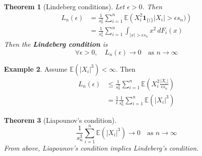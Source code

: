 \documentclass[10pt, oneside, reqno]{amsart}
\theoremstyle{plain}%
\newtheorem{thm}{Theorem}[section]
\theoremstyle{definition}
\newtheorem{exmp}[thm]{Example}
\theoremstyle{remark}
\newcommand{\E}{\mathbb{E}}
\newcommand{\indic}[1]{\mathbf{1}_{\{ #1 \}} }
\newcommand{\sumni}{\sum_{i=1}^n}
\begin{document}
\begin{thm}[Lindeberg conditions]
    Let $\epsilon > 0$.  Then \begin{align*}
        L_n(\epsilon) &= \frac{1}{s_n^2} \sum_{i=1}^n \E \left(X_i^2 \indic(|X_i| > \epsilon s_n) \right)  \\
        &= \frac{1}{s_n^2} \sumni \int_{|x| > \epsilon s_n} x^2 \, dF_i(x) 
    \end{align*}  Then the \textbf{Lindeberg condition} is \[
        \forall \epsilon > 0, \quad L_n(\epsilon) \rightarrow 0 \quad \text{as $n \rightarrow \infty$}
    \]
\end{thm}
\begin{exmp}
    Assume $\E(|X_i|^3) < \infty$.  Then \begin{align*}
        L_n(\epsilon) &\leq \frac{1}{s_n^2} \sumni \E(X_i^2 \frac{|X_i|}{\epsilon s_n}) \\
            &= \frac{1}{\epsilon} \frac{1}{s_n^3} \sumni \E(|X_i|^3)
    \end{align*}
    
\end{exmp}

\begin{thm}[Liapounov's condition]
    \[
        \frac{1}{s_n^3} \sumni \E(|X_i|^3) \rightarrow 0 \quad \text{as $n \rightarrow \infty$}
    \]  From above, Liapounov's condition implies Lindeberg's condition.
\end{thm}
\end{document}
